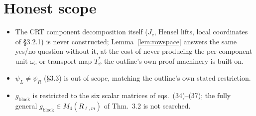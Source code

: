 \documentclass[11pt]{article}
\theoremstyle{plain}
\theoremstyle{definition}
\begin{document}
\section{Honest scope}

\begin{itemize}[leftmargin=*]
\item The CRT component decomposition itself ($J_c$, Hensel lifts, local
coordinates of \S3.2.1) is never constructed; Lemma~\ref{lem:rowspace}
answers the same yes/no question without it, at the cost of never producing
the per-component unit $\omega_c$ or transport map $T^*_\psi$ the outline's
own proof machinery is built on.
\item $\psi_L\ne\psi_R$ (\S3.3) is out of scope, matching the outline's own
stated restriction.
\item $g_{\mathrm{block}}$ is restricted to the six scalar matrices of
eqs.\ (34)--(37); the fully general $g_{\mathrm{block}}\in M_4(R_{\ell,m})$
of Thm.\ 3.2 is not searched.
\end{itemize}
\end{document}
